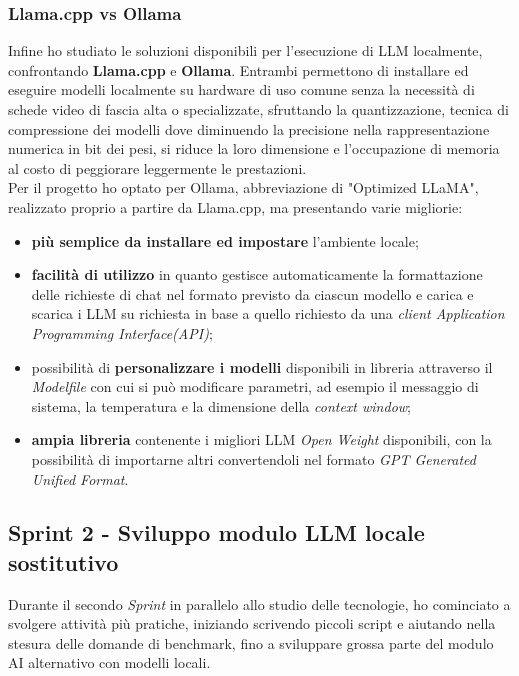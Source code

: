 \subsubsection*{Llama.cpp vs Ollama}
Infine ho studiato le soluzioni disponibili per l'esecuzione di LLM localmente, confrontando \textbf{Llama.cpp} e \textbf{Ollama}. 
Entrambi permettono di installare ed eseguire modelli localmente su hardware di uso comune senza la necessità di schede video di fascia alta o specializzate, sfruttando la quantizzazione, tecnica di compressione dei modelli dove diminuendo la precisione nella rappresentazione numerica in bit dei pesi, 
si riduce la loro dimensione e l'occupazione di memoria al costo di peggiorare leggermente le prestazioni. \\
Per il progetto ho optato per Ollama, abbreviazione di "Optimized LLaMA", realizzato proprio a partire da Llama.cpp, ma presentando varie migliorie:
\begin{itemize}
    \item \textbf{più semplice da installare ed impostare} l'ambiente locale;
    \item \textbf{facilità di utilizzo} in quanto gestisce automaticamente la formattazione delle richieste di chat nel formato previsto da ciascun modello e carica e scarica i LLM su richiesta in base a quello richiesto da una \textit{client Application Programming Interface(API)};
    \item possibilità di \textbf{personalizzare i modelli} disponibili in libreria attraverso il \textit{Modelfile} con cui si può modificare parametri, ad esempio il messaggio di sistema, la temperatura e la dimensione della \textit{context window};
    \item \textbf{ampia libreria} contenente i migliori LLM \textit{Open Weight} disponibili, con la possibilità di importarne altri convertendoli nel formato \textit{GPT Generated Unified Format}.
\end{itemize}

\subsection{Sprint 2 - Sviluppo modulo LLM locale sostitutivo}
Durante il secondo \textit{Sprint} in parallelo allo studio delle tecnologie, ho cominciato a svolgere attività più pratiche, iniziando scrivendo piccoli script e aiutando nella stesura delle domande di benchmark, fino a sviluppare grossa parte del modulo AI alternativo con modelli locali. 

